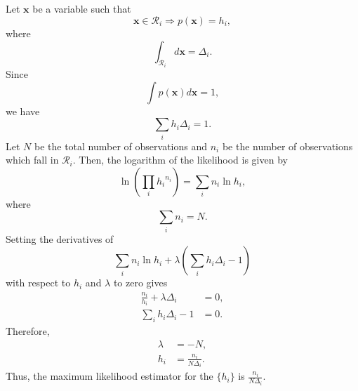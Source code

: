 \subsection{}
\label{2.60}
Let $\mathbf{x}$ be a variable such that 
%
\begin{equation}
\mathbf{x} 
\in 
\mathcal{R}_i
\Rightarrow
p(\mathbf{x})
=
h_i,
\end{equation}
%
where
%
\begin{equation}
\int_{\mathcal{R}_i}
d\mathbf{x}
=
\Delta_i.
\end{equation}
%
Since
%
\begin{equation}
\int 
p(\mathbf{x})
d\mathbf{x}
=
1,
\end{equation}
%
we have
%
\begin{equation}
\sum_i
h_i
\Delta_i
=
1.
\end{equation}
%
Let $N$ be the total number of observations and $n_i$ be the number of observations which fall in $\mathcal{R}_i$.
Then, the logarithm of the likelihood is given by
%
\begin{equation}
\ln
\left(
	\prod_{i}
	{h_i} ^ {n_i}
\right)
=
\sum_{i}
n_i 
\ln h_i,
\end{equation}
%
where
%
\begin{equation}
\sum_i n_i
=
N.
\end{equation}
%
Setting the derivatives of
%
\begin{equation}
\sum_{i}
n_i 
\ln h_i
+
\lambda
\left(
	\sum_i
	h_i
	\Delta_i
	-
	1
\right)
\end{equation}
%
with respect to $h_i$ and $\lambda$ to zero gives
%
\begin{equation}
\begin{aligned}
\frac{n_i}{h_i}
+
\lambda
\Delta_i
&=
0,
\\
\sum_i
h_i
\Delta_i
-
1
&=
0.
\end{aligned}
\end{equation}
%
Therefore,
%
\begin{equation}
\begin{aligned}
\lambda
&=
- N,
\\
h_i
&=
\frac{n_i}{N \Delta_i}.
\end{aligned}
\end{equation}
%
Thus, the maximum likelihood estimator for the $\{ h_i \}$ is $\frac{n_i}{N \Delta_i}$.


